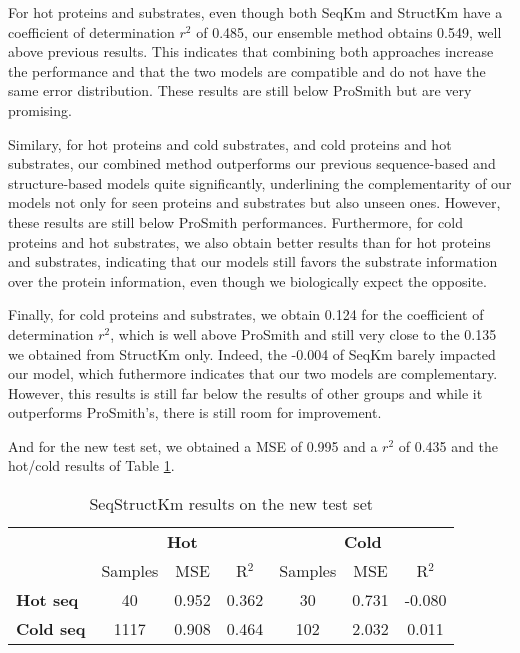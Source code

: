 For hot proteins and substrates, even though both SeqKm and StructKm have a coefficient of determination $r^2$ of 0.485, our ensemble method obtains 0.549, well above previous results. This indicates that combining both approaches increase the performance and that the two models are compatible and do not have the same error distribution. These results are still below ProSmith but are very promising.

Similary, for hot proteins and cold substrates, and cold proteins and hot substrates, our combined method outperforms our previous sequence-based and structure-based models quite significantly, underlining the complementarity of our models not only for seen proteins and substrates but also unseen ones. However, these results are still below ProSmith performances. Furthermore, for cold proteins and hot substrates, we also obtain better results than for hot proteins and substrates, indicating that our models still favors the substrate information over the protein information, even though we biologically expect the opposite. 

Finally, for cold proteins and substrates, we obtain 0.124 for the coefficient of determination $r^2$, which is well above ProSmith and still very close to the 0.135 we obtained from StructKm only. Indeed, the -0.004 of SeqKm barely impacted our model, which futhermore indicates that our two models are complementary. However, this results is still far below the results of other groups and while it outperforms ProSmith's, there is still room for improvement.

And for the new test set, we obtained a MSE of 0.995 and a $r^2$ of 0.435 and the hot/cold results of Table \ref{tab:seqstruct_test_new}.

\begin{table}[ht]
  \centering
  \begin{tabular}{lcccccc}
  \hline
   & \multicolumn{3}{c}{\textbf{Hot}} & \multicolumn{3}{c}{\textbf{Cold}} \\
   & Samples & MSE & R\(^2\) & Samples & MSE & R\(^2\) \\ \hline
  \textbf{Hot seq}  & 40 & 0.952 & 0.362 & 30 & 0.731 & -0.080 \\
  \textbf{Cold seq} & 1117 & 0.908 & 0.464 & 102 & 2.032 & 0.011 \\ \hline
  \end{tabular}
  \caption{SeqStructKm results on the new test set}
  \label{tab:seqstruct_test_new}
\end{table}

